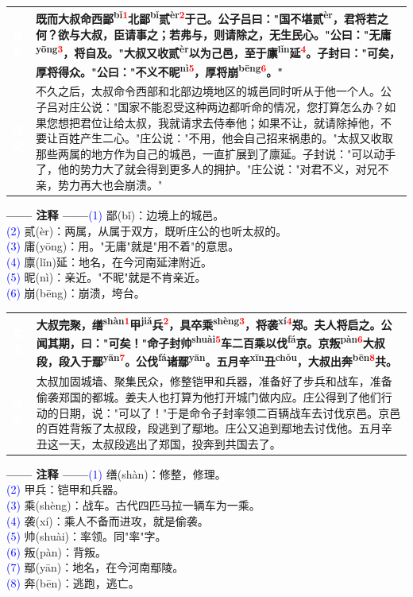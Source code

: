 \documentclass[a4paper,12pt]{ctexart}
\makeatletter
\newcommand{\ruby}[2]{#1\textsuperscript{#2}}
\newlength{\colA}\setlength{\colA}{0.06\textwidth}
\newlength{\colB}\setlength{\colB}{0.64\textwidth}
\newlength{\colC}\setlength{\colC}{0.26\textwidth}
\newcommand{\sectab}[3]{%
  \noindent
  \begin{minipage}[c]{\dimexpr\colA+\colB+2\tabcolsep\relax}
  \begin{tabular}{@{}p{\colA}p{\colB}@{}}
  \sideyuan  & {\large\bfseries #1} \\
  \sideyiwen & {\large #2} \\
  \end{tabular}
  \end{minipage}
  \hfill
  \begin{minipage}[c]{\colC}
  {\labelann\vspace{0.1cm}}#3
  \end{minipage}
  \par
}
\newcommand{\sideyuan}{\colorbox{blue!70!black}{\textcolor{white}{\normalsize\textbf{原文}}}}
\newcommand{\sideyiwen}{\colorbox{green!60!black}{\textcolor{white}{\normalsize\textbf{译文}}}}
\newcommand{\labelann}{\textcolor{orange!80!black}{\small\textbf{—— 注释 ——}}}
\newcommand{\refmark}[1]{\textsuperscript{\textcolor{red}{#1}}}
\makeatother
\begin{document}
\vspace{0.3cm}
\sectab{既而大叔命西\ruby{鄙}{bǐ}\refmark{1}北\ruby{鄙}{bǐ}\ruby{贰}{èr}\refmark{2}于己。公子吕曰："国不堪\ruby{贰}{èr}，君将若之何？欲与大叔，臣请事之；若弗与，则请除之，无生民心。"公曰："无\ruby{庸}{yōng}\refmark{3}，将自及。"大叔又收\ruby{贰}{èr}以为己邑，至于\ruby{廪}{lǐn}延\refmark{4}。子封曰："可矣，厚将得众。"公曰："不义不\ruby{昵}{nì}\refmark{5}，厚将\ruby{崩}{bēng}\refmark{6}。"}{不久之后，太叔命令西部和北部边境地区的城邑同时听从于他一个人。公子吕对庄公说："国家不能忍受这种两边都听命的情况，您打算怎么办？如果您想把君位让给太叔，我就请求去侍奉他；如果不让，就请除掉他，不要让百姓产生二心。"庄公说："不用，他会自己招来祸患的。"太叔又收取那些两属的地方作为自己的城邑，一直扩展到了廪延。子封说："可以动手了，他的势力大了就会得到更多人的拥护。"庄公说："对君不义，对兄不亲，势力再大也会崩溃。"}{{\small \textcolor{blue}{(1)} 鄙(bǐ)：边境上的城邑。}\\[0.1cm]{\small \textcolor{blue}{(2)} 贰(èr)：两属，从属于双方，既听庄公的也听太叔的。}\\[0.1cm]{\small \textcolor{blue}{(3)} 庸(yōng)：用。"无庸"就是"用不着"的意思。}\\[0.1cm]{\small \textcolor{blue}{(4)} 廪(lǐn)延：地名，在今河南延津附近。}\\[0.1cm]{\small \textcolor{blue}{(5)} 昵(nì)：亲近。"不昵"就是不肯亲近。}\\[0.1cm]{\small \textcolor{blue}{(6)} 崩(bēng)：崩溃，垮台。}}

\vspace{0.3cm}
\sectab{大叔完聚，\ruby{缮}{shàn}\refmark{1}\ruby{甲}{jiǎ}兵\refmark{2}，具卒\ruby{乘}{shèng}\refmark{3}，将\ruby{袭}{xí}\refmark{4}郑。夫人将启之。公闻其期，曰："可矣！"命子封\ruby{帅}{shuài}\refmark{5}车二百乘以\ruby{伐}{fá}京。京\ruby{叛}{pàn}\refmark{6}大叔段，段入于\ruby{鄢}{yān}\refmark{7}。公\ruby{伐}{fá}诸\ruby{鄢}{yān}。五月\ruby{辛}{xīn}\ruby{丑}{chǒu}，大叔出\ruby{奔}{bēn}\refmark{8}共。}{太叔加固城墙、聚集民众，修整铠甲和兵器，准备好了步兵和战车，准备偷袭郑国的都城。姜夫人也打算为他打开城门做内应。庄公得到了他们行动的日期，说："可以了！"于是命令子封率领二百辆战车去讨伐京邑。京邑的百姓背叛了太叔段，段逃到了鄢地。庄公又追到鄢地去讨伐他。五月辛丑这一天，太叔段逃出了郑国，投奔到共国去了。}{{\small \textcolor{blue}{(1)} 缮(shàn)：修整，修理。}\\[0.1cm]{\small \textcolor{blue}{(2)} 甲兵：铠甲和兵器。}\\[0.1cm]{\small \textcolor{blue}{(3)} 乘(shèng)：战车。古代四匹马拉一辆车为一乘。}\\[0.1cm]{\small \textcolor{blue}{(4)} 袭(xí)：乘人不备而进攻，就是偷袭。}\\[0.1cm]{\small \textcolor{blue}{(5)} 帅(shuài)：率领。同"率"字。}\\[0.1cm]{\small \textcolor{blue}{(6)} 叛(pàn)：背叛。}\\[0.1cm]{\small \textcolor{blue}{(7)} 鄢(yān)：地名，在今河南鄢陵。}\\[0.1cm]{\small \textcolor{blue}{(8)} 奔(bēn)：逃跑，逃亡。}}
\end{document}
